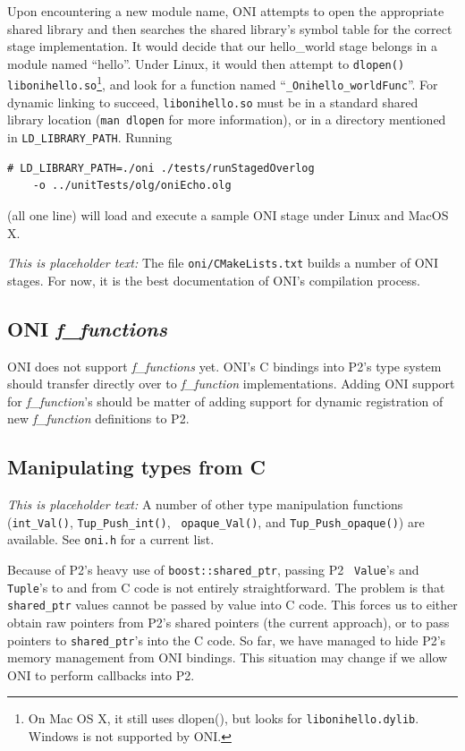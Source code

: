 \documentclass{article}
\begin{document}
Upon encountering a new module name, ONI attempts to open the
appropriate shared library and then searches the shared library's
symbol table for the correct stage implementation.  It would decide
that our hello\_world stage belongs in a module named ``hello''.
Under Linux, it would then attempt to {\tt dlopen()}
{\tt libonihello.so}\footnote{On Mac OS X, it still uses dlopen(), but
  looks for {\tt libonihello.dylib}.  Windows is not supported by ONI.},
and look for a function named ``{\tt \_Onihello\_worldFunc}''.  For
dynamic linking to succeed, {\tt libonihello.so} must be in a standard
shared library location ({\tt man dlopen} for more information), or in
a directory mentioned in {\tt LD\_LIBRARY\_PATH}.  Running

\begin{verbatim}
# LD_LIBRARY_PATH=./oni ./tests/runStagedOverlog
    -o ../unitTests/olg/oniEcho.olg
\end{verbatim}
(all one line) will load and execute a sample ONI stage
under Linux and MacOS X.

{\em This is placeholder text:} The file {\tt oni/CMakeLists.txt}
builds a number of ONI stages.  For now, it is the best documentation
of ONI's compilation process.

\subsection{ONI {\em f\_functions}}

ONI does not support {\em f\_functions} yet.  ONI's C bindings into
P2's type system should transfer directly over to {\em f\_function}
implementations.  Adding ONI support for {\em f\_function}'s should be
matter of adding support for dynamic registration of new {\em f\_function}
definitions to P2.

\subsection{Manipulating \ol types from C}

{\em This is placeholder text:} A number of other \ol type
manipulation functions ({\tt int\_Val()}, {\tt Tup\_Push\_int()}, {\tt
  opaque\_Val()}, and {\tt Tup\_Push\_opaque()}) are available.  See
{\tt oni.h} for a current list.

Because of P2's heavy use of {\tt boost::shared\_ptr}, passing P2 {\tt
  Value}'s and {\tt Tuple}'s to and from C code is not entirely
straightforward.  The problem is that {\tt shared\_ptr} values cannot
be passed by value into C code.  This forces us to either obtain raw
pointers from P2's shared pointers (the current approach), or to pass
pointers to {\tt shared\_ptr}'s into the C code.  So far, we have
managed to hide P2's memory management from ONI bindings.  This
situation may change if we allow ONI to perform callbacks into P2.
\end{document}
